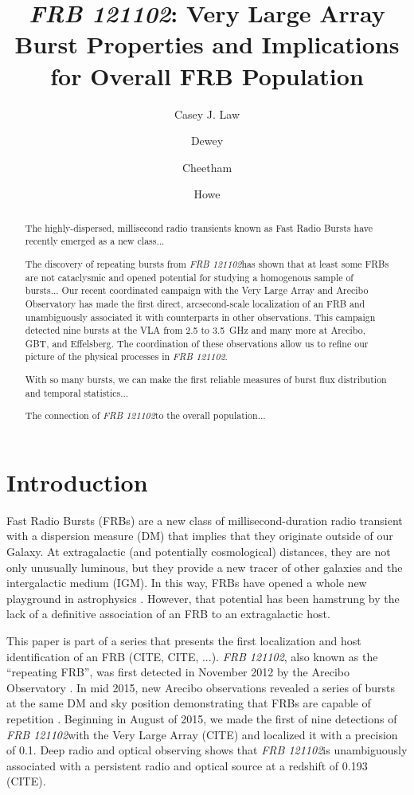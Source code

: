 \documentclass{emulateapj}
\newcommand{\frb}{\emph{FRB 121102}}
\begin{document}
\title{\frb: Very Large Array Burst Properties and Implications for Overall FRB Population}
\shorttitle{\frb Burst Properties}

\author{Casey J. Law}
\author{Dewey}
\author{Cheetham}\author{Howe}

\begin{abstract}
The highly-dispersed, millisecond radio transients known as Fast Radio Bursts have recently emerged as a new class...

The discovery of repeating bursts from \frb has shown that at least some FRBs are not cataclysmic and opened potential for studying a homogenous sample of bursts...
Our recent coordinated campaign with the Very Large Array and Arecibo Observatory has made the first direct, arcsecond-scale localization of an FRB and unambiguously associated it with counterparts in other observations. This campaign detected nine bursts at the VLA from 2.5 to 3.5~GHz and many more at Arecibo, GBT, and Effelsberg. The coordination of these observations allow us to refine our picture of the physical processes in \frb.

With so many bursts, we can make the first reliable measures of burst flux distribution and temporal statistics...

The connection of \frb to the overall population...

\end{abstract}

\section{Introduction}
Fast Radio Bursts (FRBs) are a new class of millisecond-duration radio transient with a dispersion measure (DM) that implies that they originate outside of our Galaxy. At extragalactic (and potentially cosmological) distances, they are not only unusually luminous, but they provide a new tracer of other galaxies and the intergalactic medium (IGM). In this way, FRBs have opened a whole new playground in astrophysics \citep[e.g.,][]{2014A&A...562A.137F, 2014ApJ...780L..33M, 2016MNRAS.457..232C}. However, that potential has been hamstrung by the lack of a definitive association of an FRB to an extragalactic host.

This paper is part of a series that presents the first localization and host identification of an FRB (CITE, CITE, ...). \frb, also known as the ``repeating FRB'', was first detected in November 2012 by the Arecibo Observatory \citep{2014ApJ...790..101S}. In mid 2015, new Arecibo observations revealed a series of bursts at the same DM and sky position demonstrating that FRBs are capable of repetition \citep{2016Natur.531..202S}. Beginning in August of 2015, we made the first of nine detections of \frb with the Very Large Array (CITE) and localized it with a precision of 0.1\arcsec. Deep radio and optical observing shows that \frb is unambiguously associated with a persistent radio and optical source at a redshift of 0.193 (CITE).
\end{document}
